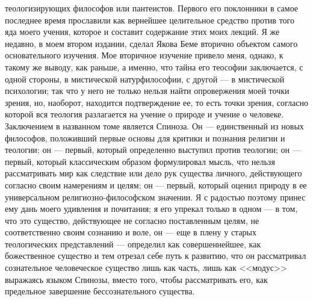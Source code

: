 \documentclass[12pt]{article}
\begin{document}
теологизирующих философов или пантеистов. Первого его поклонники в самое последнее время прославили как вернейшее целительное средство против того яда моего учения, которое и составит содержание этих моих лекций. Я же недавно, в моем втором издании, сделал Якова Беме вторично объектом самого основательного изучения. Мое вторичное изучение привело меня, однако, к такому же выводу, как раньше, а именно, что тайна его теософии заключается, с одной стороны, в мистической натурфилософии, с другой --- в мистической психологии; так что у него не только нельзя найти опровержения моей точки зрения, но, наоборот, находится подтверждение ее, то есть точки зрения, согласно которой вся теология разлагается на учение о природе и учение о человеке. Заключением в названном томе является Спиноза. Он --- единственный из новых философов, положивший первые основы для критики и познания религии и теологии; он --- первый, который определенно выступил против теологии; он --- первый, который классическим образом формулировал мысль, что нельзя рассматривать мир как следствие или дело рук существа личного, действующего согласно своим намерениям и целям; он --- первый, который оценил природу в ее универсальном религиозно-философском значении. Я с радостью поэтому принес ему дань моего удивления и почитания; я его упрекал только в одном --- в том, что это существо, действующее не согласно поставленным целям, не соответственно своим сознанию и воле, он --- еще в плену у старых теологических представлений --- определил как совершеннейшее, как божественное существо и тем отрезал себе путь к развитию, что он рассматривал сознательное человеческое существо лишь как часть, лишь как <<модус>>  выражаясь языком Спинозы, вместо того, чтобы рассматривать его, как предельное завершение бессознательного существа. 
\end{document}
